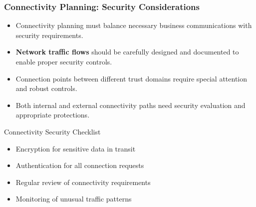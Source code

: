 \documentclass{beamer}
\begin{document}
\begin{frame}
    \frametitle{Connectivity Planning: Security Considerations}
    \begin{itemize}
        \item Connectivity planning must balance necessary business communications with security requirements.
        \item \textbf{Network traffic flows} should be carefully designed and documented to enable proper security controls.
        \item Connection points between different trust domains require special attention and robust controls.
        \item Both internal and external connectivity paths need security evaluation and appropriate protections.
    \end{itemize}
    
    \begin{exampleblock}{Connectivity Security Checklist}
        \begin{itemize}
            \item Encryption for sensitive data in transit
            \item Authentication for all connection requests
            \item Regular review of connectivity requirements
            \item Monitoring of unusual traffic patterns
        \end{itemize}
    \end{exampleblock}
\end{frame}
\end{document}
